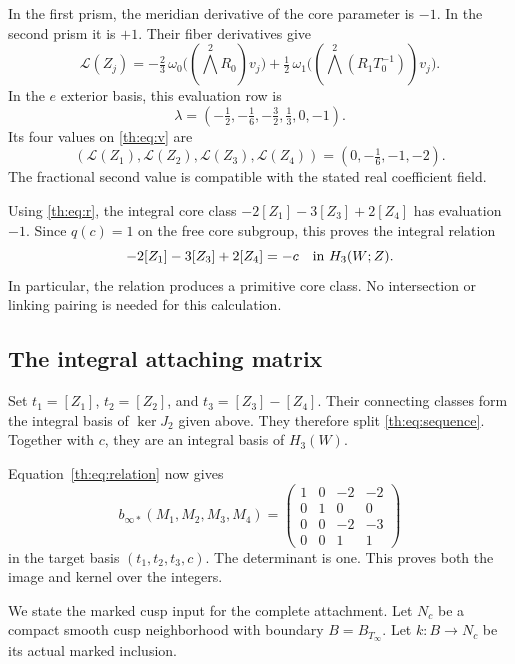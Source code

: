 In the first prism, the meridian derivative of the core parameter is $-1$.
In the second prism it is $+1$.
Their fiber derivatives give
\begin{equation}\label{th:eq:evaluation}
\mathcal L(Z_j)
=-\tfrac23\,\omega_0\bigl((\bigwedge^2R_0)v_j\bigr)
 {}+\tfrac12\,\omega_1\bigl((\bigwedge^2(R_1T_0^{-1}))v_j\bigr).
\end{equation}
In the $e$ exterior basis, this evaluation row is
\[
\lambda=(-\tfrac12,-\tfrac16,-\tfrac32,\tfrac13,0,-1).
\]
Its four values on \eqref{th:eq:v} are
\begin{equation}\label{th:eq:values}
(\mathcal L(Z_1),\mathcal L(Z_2),\mathcal L(Z_3),\mathcal L(Z_4))
=(0,-\tfrac16,-1,-2).
\end{equation}
The fractional second value is compatible with the stated real coefficient field.

Using \eqref{th:eq:r}, the integral core class
$-2[Z_1]-3[Z_3]+2[Z_4]$ has evaluation $-1$.
Since $q(c)=1$ on the free core subgroup, this proves the integral relation
\begin{equation}\label{th:eq:relation}
-2[Z_1]-3[Z_3]+2[Z_4]=-c
\quad\hbox{in }H_3(W;\mathbb Z).
\end{equation}
In particular, the relation produces a primitive core class.
No intersection or linking pairing is needed for this calculation.

\subsection{The integral attaching matrix}

Set
$t_1=[Z_1]$, $t_2=[Z_2]$, and $t_3=[Z_3]-[Z_4]$.
Their connecting classes form the integral basis of $\ker J_2$ given above.
They therefore split \eqref{th:eq:sequence}.
Together with $c$, they are an integral basis of $H_3(W)$.

Equation~\eqref{th:eq:relation} now gives
\begin{equation}\label{th:eq:meridianmatrix}
b_{\infty*}(M_1,M_2,M_3,M_4)=
\begin{pmatrix}
1&0&-2&-2\\0&1&0&0\\0&0&-2&-3\\0&0&1&1
\end{pmatrix}
\end{equation}
in the target basis $(t_1,t_2,t_3,c)$.
The determinant is one.
This proves both the image and kernel over the integers.

We state the marked cusp input for the complete attachment.
Let $N_c$ be a compact smooth cusp neighborhood with boundary $B=B_{T_\infty}$.
Let $k:B\to N_c$ be its actual marked inclusion.

